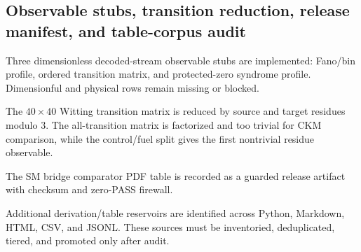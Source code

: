 \subsection{Observable stubs, transition reduction, release manifest, and table-corpus audit}
\label{sec:bt1627-bt1630-observable-reduction-audit}

Three dimensionless decoded-stream observable stubs are implemented: Fano/bin profile, ordered transition matrix, and protected-zero syndrome profile.  Dimensionful and physical rows remain missing or blocked.

The $40\times40$ Witting transition matrix is reduced by source and target residues modulo $3$.  The all-transition matrix is factorized and too trivial for CKM comparison, while the control/fuel split gives the first nontrivial residue observable.

The SM bridge comparator PDF table is recorded as a guarded release artifact with checksum and zero-PASS firewall.

Additional derivation/table reservoirs are identified across Python, Markdown, HTML, CSV, and JSONL.  These sources must be inventoried, deduplicated, tiered, and promoted only after audit.
